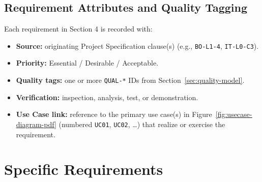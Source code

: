 \documentclass[11pt,a4paper]{article}
\let\origref\ref
\renewcommand{\ref}[1]{\uline{\origref{#1}}}%
\begin{document}
\subsection{Requirement Attributes and Quality Tagging}
Each requirement in Section 4 is recorded with:
\begin{itemize}[leftmargin=*,nosep]
  \item \textbf{Source:} originating Project Specification clause(s) (e.g., \texttt{BO-L1-4}, \texttt{IT-L0-C3}).
  \item \textbf{Priority:} Essential / Desirable / Acceptable.
  \item \textbf{Quality tags:} one or more \texttt{QUAL-*} IDs from Section~\ref{sec:quality-model}.
  \item \textbf{Verification:} inspection, analysis, test, or demonstration.
  \item \textbf{Use Case link:} reference to the primary use case(s) in Figure~\ref{fig:usecase-diagram-pdf} (numbered \texttt{UC01}, \texttt{UC02}, \dots) that realize or exercise the requirement.
\end{itemize}

\section{Specific Requirements}
\label{sec:requirements}
\end{document}
